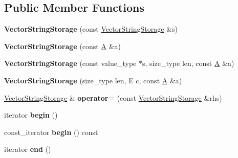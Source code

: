 \subsection*{Public Member Functions}
\begin{DoxyCompactItemize}
\item 
\hypertarget{classVectorStringStorage_ad715f0a0671ba6532afdb211aa677d2b}{}{\bfseries Vector\+String\+Storage} (const \hyperlink{classVectorStringStorage}{Vector\+String\+Storage} \&s)\label{classVectorStringStorage_ad715f0a0671ba6532afdb211aa677d2b}

\item 
\hypertarget{classVectorStringStorage_af23655e06cbaf96efbc9d0fe2a4d6503}{}{\bfseries Vector\+String\+Storage} (const \hyperlink{structA}{A} \&a)\label{classVectorStringStorage_af23655e06cbaf96efbc9d0fe2a4d6503}

\item 
\hypertarget{classVectorStringStorage_a91076be5a967d6436014915b98661a1e}{}{\bfseries Vector\+String\+Storage} (const value\+\_\+type $\ast$s, size\+\_\+type len, const \hyperlink{structA}{A} \&a)\label{classVectorStringStorage_a91076be5a967d6436014915b98661a1e}

\item 
\hypertarget{classVectorStringStorage_a31974377ea2de28c7bc056919613af9c}{}{\bfseries Vector\+String\+Storage} (size\+\_\+type len, E c, const \hyperlink{structA}{A} \&a)\label{classVectorStringStorage_a31974377ea2de28c7bc056919613af9c}

\item 
\hypertarget{classVectorStringStorage_ad0acdefa3c4ca7b744b20a9e7094cc6b}{}\hyperlink{classVectorStringStorage}{Vector\+String\+Storage} \& {\bfseries operator=} (const \hyperlink{classVectorStringStorage}{Vector\+String\+Storage} \&rhs)\label{classVectorStringStorage_ad0acdefa3c4ca7b744b20a9e7094cc6b}

\item 
\hypertarget{classVectorStringStorage_a3138da18e11c575524b854288e41d384}{}iterator {\bfseries begin} ()\label{classVectorStringStorage_a3138da18e11c575524b854288e41d384}

\item 
\hypertarget{classVectorStringStorage_a575a96552df0ab9313f23e3617153cc5}{}const\+\_\+iterator {\bfseries begin} () const \label{classVectorStringStorage_a575a96552df0ab9313f23e3617153cc5}

\item 
\hypertarget{classVectorStringStorage_a9d90082252607833960025bc1d8aea33}{}iterator {\bfseries end} ()\label{classVectorStringStorage_a9d90082252607833960025bc1d8aea33}


\end{DoxyCompactItemize}
